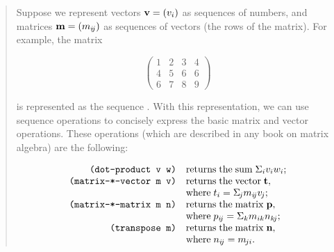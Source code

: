 \begin{quote}
Suppose we represent vectors \( \hbox{\bf v} = (v_i) \) as sequences of numbers, and
matrices \( \hbox{\bf m} = (m_{i\!j}) \) as sequences of vectors (the rows of the
matrix).  For example, the matrix

$$
\left(
\begin{array}{cccc}
  1 & 2 & 3 & 4 \\
  4 & 5 & 6 & 6 \\
  6 & 7 & 8 & 9
\end{array}
\right)
$$

\noindent
is represented as the sequence .  With
this representation, we can use sequence operations to concisely express the
basic matrix and vector operations.  These operations (which are described in
any book on matrix algebra) are the following:

$$
\begin{array}{rl}
	\hbox{\tt (dot-product v w)} 		& {\rm returns\;the\;sum\;} \Sigma_i v_i w_i; \\
	\hbox{\tt (matrix-*-vector m v)} 	& {\rm returns\;the\;vector\;} \hbox{\bf t},  \\
		& {\rm where\;} t_i = \Sigma_{\kern-0.1em j} m_{i\!j} v_{\kern-0.1em j};      \\
	\hbox{\tt (matrix-*-matrix m n)} 	& {\rm returns\;the\;matrix\;} \hbox{\bf p},  \\
		& {\rm where\;} p_{i\!j} = \Sigma_k m_{ik} n_{k\!j};                          \\
	\hbox{\tt (transpose m)} 		& {\rm returns\;the\;matrix\;} \hbox{\bf n},  \\
		& {\rm where\;} n_{i\!j} = m_{\kern-0.1em ji}.
\end{array}
$$


\end{quote}

